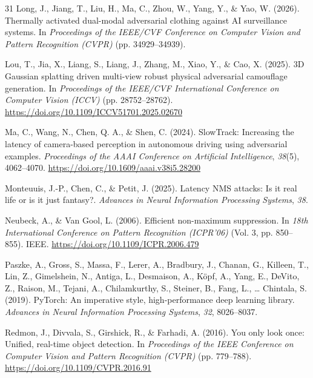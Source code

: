 \begin{thebibliography}{31}
Long, J., Jiang, T., Liu, H., Ma, C., Zhou, W., Yang, Y., \& Yao, W. (2026). Thermally activated dual-modal adversarial clothing against AI surveillance systems. In \textit{Proceedings of the IEEE/CVF Conference on Computer Vision and Pattern Recognition (CVPR)} (pp. 34929--34939).

Lou, T., Jia, X., Liang, S., Liang, J., Zhang, M., Xiao, Y., \& Cao, X. (2025). 3D Gaussian splatting driven multi-view robust physical adversarial camouflage generation. In \textit{Proceedings of the IEEE/CVF International Conference on Computer Vision (ICCV)} (pp. 28752--28762). \url{https://doi.org/10.1109/ICCV51701.2025.02670}

Ma, C., Wang, N., Chen, Q. A., \& Shen, C. (2024). SlowTrack: Increasing the latency of camera-based perception in autonomous driving using adversarial examples. \textit{Proceedings of the AAAI Conference on Artificial Intelligence}, \textit{38}(5), 4062--4070. \url{https://doi.org/10.1609/aaai.v38i5.28200}

Monteuuis, J.-P., Chen, C., \& Petit, J. (2025). Latency NMS attacks: Is it real life or is it just fantasy?. \textit{Advances in Neural Information Processing Systems}, \textit{38}.

Neubeck, A., \& Van Gool, L. (2006). Efficient non-maximum suppression. In \textit{18th International Conference on Pattern Recognition (ICPR'06)} (Vol. 3, pp. 850--855). IEEE. \url{https://doi.org/10.1109/ICPR.2006.479}

Paszke, A., Gross, S., Massa, F., Lerer, A., Bradbury, J., Chanan, G., Killeen, T., Lin, Z., Gimelshein, N., Antiga, L., Desmaison, A., K{\"o}pf, A., Yang, E., DeVito, Z., Raison, M., Tejani, A., Chilamkurthy, S., Steiner, B., Fang, L., \ldots{} Chintala, S. (2019). PyTorch: An imperative style, high-performance deep learning library. \textit{Advances in Neural Information Processing Systems}, \textit{32}, 8026--8037.

Redmon, J., Divvala, S., Girshick, R., \& Farhadi, A. (2016). You only look once: Unified, real-time object detection. In \textit{Proceedings of the IEEE Conference on Computer Vision and Pattern Recognition (CVPR)} (pp. 779--788). \url{https://doi.org/10.1109/CVPR.2016.91}


\end{thebibliography}
